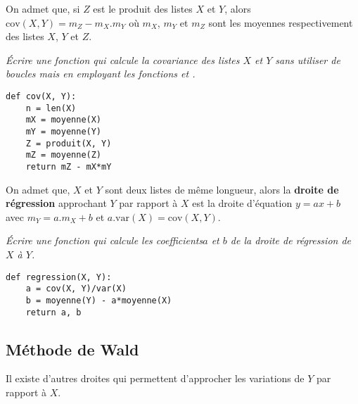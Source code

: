 On admet que, si $Z$ est le produit des listes $X$ et $Y$, alors $\text{cov}(X, Y) = m_Z - m_X.m_Y$ où $m_X$, $m_Y$ et $m_Z$ sont les moyennes respectivement des listes $X$, $Y$ et $Z$.
\begin{Exercise}[title = Calcul alternatif]
\it Écrire une fonction  qui calcule la covariance des listes $X$ et $Y$ sans utiliser de boucles mais en employant les fonctions  et .
\end{Exercise}
\begin{Answer}
\begin{lstlisting}
def cov(X, Y):
    n = len(X)
    mX = moyenne(X)
    mY = moyenne(Y)
    Z = produit(X, Y)
    mZ = moyenne(Z)
    return mZ - mX*mY
\end{lstlisting}
\newpage
\end{Answer}
\bigskip

On admet que, $X$ et $Y$ sont deux listes de même longueur, alors la {\bf droite de régression} approchant $Y$ par rapport à $X$ est la droite d'équation $y = ax+b$ avec $m_Y = a.m_X + b$ et $a.\text{var}(X)=\text{cov}(X, Y)$.
\begin{Exercise}[title = Droite de régression]
\it Écrire une fonction  qui calcule les coefficients$a$ et $b$ de la droite de régression de $X$ à $Y$.
\end{Exercise}
\begin{Answer}
\begin{lstlisting}
def regression(X, Y):
    a = cov(X, Y)/var(X)
    b = moyenne(Y) - a*moyenne(X)
    return a, b
\end{lstlisting}
\end{Answer}
\subsection{Méthode de Wald} 
Il existe d'autres droites qui permettent d'approcher les variations de $Y$ par rapport à $X$.

